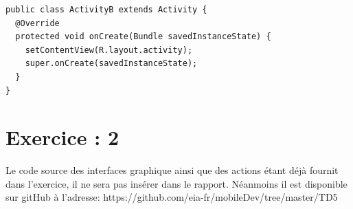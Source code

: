 \begin{lstlisting}
public class ActivityB extends Activity {
  @Override
  protected void onCreate(Bundle savedInstanceState) {
    setContentView(R.layout.activity);
    super.onCreate(savedInstanceState);
  }
}
\end{lstlisting}



	\section{Exercice : 2}
	Le code source des interfaces graphique ainsi que des actions étant déjà fournit dans l'exercice, il ne sera pas insérer dans le rapport. Néanmoins il est disponible sur gitHub à l'adresse: https://github.com/eia-fr/mobileDev/tree/master/TD5
